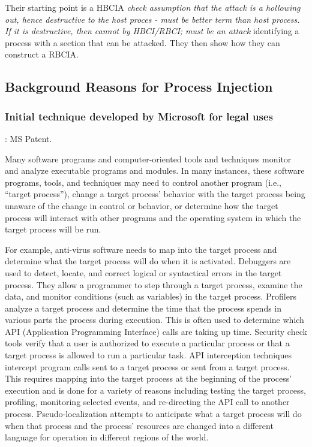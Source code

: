 \documentclass{article}
\begin{document}
Their starting point is a HBCIA \textit{check assumption that the attack is a hollowing out, hence destructive to the host proces - must be better term than host process. If it is destructive, then cannot by HBCI/RBCI; must be an attack} identifying a process with a section that can be attacked.  They then show how they can construct a RBCIA.


\subsection{Background Reasons for Process Injection}


\subsubsection{Initial technique developed by Microsoft for legal uses}

\textbf{}: \textcite{Ghizzoni:2004} MS Patent.

Many software programs and computer-oriented tools and techniques monitor and analyze executable programs and modules. In many instances, these software programs, tools, and techniques may need to control another program (i.e., “target process”), change a target process' behavior with the target process being unaware of the change in control or behavior, or determine how the target process will interact with other programs and the operating system in which the target process will be run.

For example, anti-virus software needs to map into the target process and determine what the target process will do when it is activated. Debuggers are used to detect, locate, and correct logical or syntactical errors in the target process. They allow a programmer to step through a target process, examine the data, and monitor conditions (such as variables) in the target process. Profilers analyze a target process and determine the time that the process spends in various parts the process during execution. This is often used to determine which API (Application Programming Interface) calls are taking up time. Security check tools verify that a user is authorized to execute a particular process or that a target process is allowed to run a particular task. API interception techniques intercept program calls sent to a target process or sent from a target process. This requires mapping into the target process at the beginning of the process' execution and is done for a variety of reasons including testing the target process, profiling, monitoring selected events, and re-directing the API call to another process. Pseudo-localization attempts to anticipate what a target process will do when that process and the process' resources are changed into a different language for operation in different regions of the world.
\end{document}
